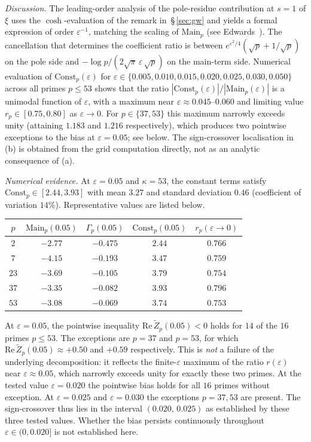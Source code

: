 \documentclass[11pt]{article}
\newcommand{\Zt}{\widetilde{Z}}
\begin{document}
\emph{Discussion.}
The leading-order analysis of the pole-residue contribution at $s=1$
of $\xi$ uses the $\cosh$-evaluation of the remark in~\S\,\ref{sec:gw}
and yields a formal expression of order $\varepsilon^{-1}$, matching
the scaling of $\mathrm{Main}_p$ (see
Edwards~\cite[\S1.16 and \S3.6]{Edwards}).
The cancellation that determines the coefficient ratio is between
$e^{\varepsilon^2/4}(\sqrt p + 1/\sqrt p)$ on the pole side and
$-\log p/(2\sqrt\pi\,\varepsilon\,\sqrt p)$ on the main-term side.
Numerical evaluation of $\mathrm{Const}_p(\varepsilon)$ for
$\varepsilon\in\{0.005,0.010,0.015,0.020,0.025,0.030,0.050\}$ across
all primes $p\le 53$ shows that the ratio
$|\mathrm{Const}_p(\varepsilon)|/|\mathrm{Main}_p(\varepsilon)|$ is a
unimodal function of $\varepsilon$, with a maximum near
$\varepsilon\approx 0.045$--$0.060$ and limiting value
$r_p\in[0.75,0.80]$ as $\varepsilon\to 0$.
For $p\in\{37,53\}$ this maximum narrowly exceeds unity (attaining
$1.183$ and $1.216$ respectively), which produces two pointwise
exceptions to the bias at $\varepsilon=0.05$; see below.
The sign-crossover localisation in (b) is obtained from the grid
computation directly, not as an analytic consequence of (a).

\emph{Numerical evidence.}
At $\varepsilon=0.05$ and $\kappa=53$, the constant terms satisfy
$\mathrm{Const}_p\in[2.44,3.93]$ with mean $3.27$ and standard
deviation $0.46$ (coefficient of variation $14\%$).
Representative values are listed below.

\begin{table}[h]
\centering
\begin{tabular}{ccccc}
\toprule
$p$ & $\mathrm{Main}_p(0.05)$ & $\Gamma_p(0.05)$
    & $\mathrm{Const}_p(0.05)$ & $r_p(\varepsilon\to 0)$ \\
\midrule
$2$  & $-2.77$ & $-0.475$ & $2.44$ & $0.766$ \\
$7$  & $-4.15$ & $-0.193$ & $3.47$ & $0.759$ \\
$23$ & $-3.69$ & $-0.105$ & $3.79$ & $0.754$ \\
$37$ & $-3.35$ & $-0.082$ & $3.93$ & $0.796$ \\
$53$ & $-3.08$ & $-0.069$ & $3.74$ & $0.753$ \\
\bottomrule
\end{tabular}
\end{table}

At $\varepsilon=0.05$, the pointwise inequality
$\mathrm{Re}\,\Zt_p(0.05)<0$ holds for $14$ of the $16$ primes
$p\le 53$.
The exceptions are $p=37$ and $p=53$, for which
$\mathrm{Re}\,\Zt_p(0.05)\approx+0.50$ and $+0.59$ respectively.
This is \emph{not} a failure of the underlying decomposition: it
reflects the finite-$\varepsilon$ maximum of the ratio $r(\varepsilon)$
near $\varepsilon\approx 0.05$, which narrowly exceeds unity for
exactly these two primes.
At the tested value $\varepsilon=0.020$ the pointwise bias holds for
all $16$ primes without exception.
At $\varepsilon=0.025$ and $\varepsilon=0.030$ the exceptions
$p=37,53$ are present.
The sign-crossover thus lies in the interval $(0.020,\,0.025)$ as
established by these three tested values.
Whether the bias persists continuously throughout
$\varepsilon\in(0,0.020]$ is not established here.
\end{document}
